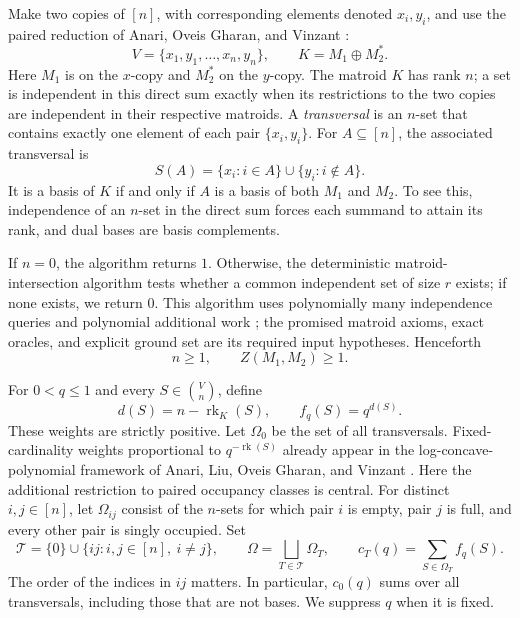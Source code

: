 \documentclass[11pt]{article}
\theoremstyle{definition}
\newcommand{\rank}{\operatorname{rk}}
\newcommand{\Om}{\Omega}
\begin{document}
Make two copies of $[n]$, with corresponding elements denoted $x_i,y_i$,
and use the paired reduction of Anari, Oveis Gharan, and Vinzant
\cite[arXiv version~2, Section~7, Equation~(13)]{AOV2021}:
\[
 V=\{x_1,y_1,\ldots,x_n,y_n\},\qquad
 K=M_1\oplus M_2^*.
\]
Here $M_1$ is on the $x$-copy and $M_2^*$ on the $y$-copy.  The matroid
$K$ has rank $n$; a set is independent in this direct sum exactly when its
restrictions to the two copies are independent in their respective
matroids.  A \emph{transversal} is an $n$-set that contains exactly
one element of each pair $\{x_i,y_i\}$.  For $A\subseteq[n]$, the
associated transversal is
\[
 S(A)=\{x_i:i\in A\}\cup\{y_i:i\notin A\}.
\]
It is a basis of $K$ if and only if $A$ is a basis of both $M_1$ and $M_2$.
To see this, independence of an $n$-set in the direct sum forces each
summand to attain its rank, and dual bases are basis complements.

If $n=0$, the algorithm returns $1$.  Otherwise, the deterministic
matroid-intersection algorithm tests whether a common independent set of
size $r$ exists; if none exists, we return $0$.  This algorithm uses
polynomially many independence queries and polynomial additional work
\cite[Section~41.2, Theorem~41.4]{Schrijver2003};
the promised matroid axioms, exact
oracles, and explicit ground set are its required input hypotheses.
Henceforth
\begin{equation}\label{eq:feasible}
 n\ge1,\qquad Z(M_1,M_2)\ge1.
\end{equation}

For $0<q\le1$ and every $S\in\binom Vn$, define
\begin{equation}\label{eq:rankweights}
 d(S)=n-\rank_K(S),\qquad f_q(S)=q^{d(S)}.
\end{equation}
These weights are strictly positive.  Let $\Om_0$ be the set of all
transversals.
Fixed-cardinality weights proportional to $q^{-\rank(S)}$ already
appear in the log-concave-polynomial framework of Anari, Liu,
Oveis Gharan, and Vinzant
\cite[arXiv version~3, Theorem~1.6]{ALOV2024}.
Here the additional restriction to paired occupancy classes is central.
For distinct $i,j\in[n]$, let $\Om_{ij}$ consist of the
$n$-sets for which pair $i$ is empty, pair $j$ is full, and every other
pair is singly occupied.  Set
\begin{equation}\label{eq:types}
 \mathcal T=\{0\}\cup\{ij:i,j\in[n],\ i\ne j\},\qquad
 \Om=\bigsqcup_{T\in\mathcal T}\Om_T,\qquad
 c_T(q)=\sum_{S\in\Om_T}f_q(S).
\end{equation}
The order of the indices in $ij$ matters.  In particular, $c_0(q)$ sums
over all transversals, including those that are not bases.  We suppress
$q$ when it is fixed.
\end{document}
